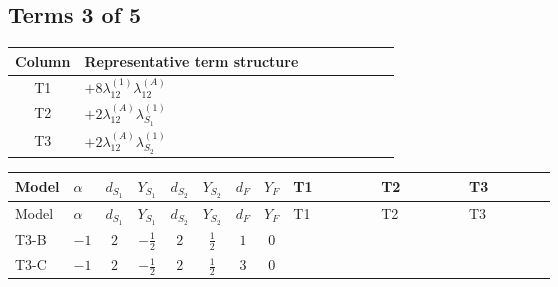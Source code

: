 \documentclass[8pt]{article}
\begin{document}
\begin{landscape}
\subsection*{Terms 3 of 5}
\begin{center}
\begin{tabular}{@{}c >{\raggedright\arraybackslash}p{0.82\linewidth}@{}}
\toprule
Column & Representative term structure \\
\midrule
T1 & \(\displaystyle +8 {\lambda_{12}^{(1)}} {\lambda_{12}^{(A)}}\) \\
\midrule
T2 & \(\displaystyle +2 {\lambda_{12}^{(A)}} {\lambda_{S_1}^{(1)}}\) \\
\midrule
T3 & \(\displaystyle +2 {\lambda_{12}^{(A)}} {\lambda_{S_2}^{(1)}}\) \\
\midrule
\bottomrule
\end{tabular}
\end{center}
\smallskip
\tiny
\begin{longtable}{@{}llcccccc >{\raggedright\arraybackslash}p{0.21\linewidth} >{\raggedright\arraybackslash}p{0.21\linewidth} >{\raggedright\arraybackslash}p{0.21\linewidth}@{}}
\toprule
Model & $\alpha$ & $d_{S_1}$ & $Y_{S_1}$ & $d_{S_2}$ & $Y_{S_2}$ & $d_F$ & $Y_F$ & T1 & T2 & T3 \\
\midrule
\endfirsthead
\toprule
Model & $\alpha$ & $d_{S_1}$ & $Y_{S_1}$ & $d_{S_2}$ & $Y_{S_2}$ & $d_F$ & $Y_F$ & T1 & T2 & T3 \\
\midrule
\endhead
T3-B & $-1$ & $2$ & $-\frac{1}{2}$ & $2$ & $\frac{1}{2}$ & $1$ & $0$ & \scriptsize\adjustbox{max width=\linewidth}{$\begin{gathered} +8 {\lambda_{12}^{(1)}} {\lambda_{12}^{(A)}}\end{gathered}$} & \scriptsize\adjustbox{max width=\linewidth}{$\begin{gathered} +2 {\lambda_{12}^{(A)}} {\lambda_{S_1}^{(1)}}\end{gathered}$} & \scriptsize\adjustbox{max width=\linewidth}{$\begin{gathered} +2 {\lambda_{12}^{(A)}} {\lambda_{S_2}^{(1)}}\end{gathered}$} \\
\midrule
T3-C & $-1$ & $2$ & $-\frac{1}{2}$ & $2$ & $\frac{1}{2}$ & $3$ & $0$ & \scriptsize\adjustbox{max width=\linewidth}{$\begin{gathered} +8 {\lambda_{12}^{(1)}} {\lambda_{12}^{(A)}}\end{gathered}$} & \scriptsize\adjustbox{max width=\linewidth}{$\begin{gathered} +2 {\lambda_{12}^{(A)}} {\lambda_{S_1}^{(1)}}\end{gathered}$} & \scriptsize\adjustbox{max width=\linewidth}{$\begin{gathered} +2 {\lambda_{12}^{(A)}} {\lambda_{S_2}^{(1)}}\end{gathered}$} \\

\end{longtable}
\end{landscape}
\end{document}
